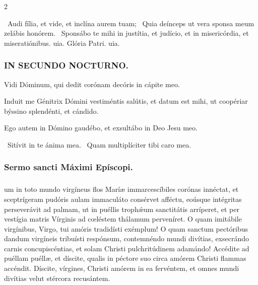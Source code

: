 \documentclass[9pt,twoside]{extarticle}
\begin{document}
\begin{multicols}{2}
{\begin{tightlist}{}
\item {}~Audi fília, et vide, et inclína aurem tuam; \textred{*}~Quia deínceps ut vera sponsa meum zelábis honórem. ~Sponsábo te mihi in justítia, et judício, et in misericórdia, et miseratiónibus. uia. Glória Patri. uia.
\end{tightlist}

\subsubsection*{\center \textsc{IN SECUNDO NOCTURNO.}}
\begin{tightlist}{}
\item {} Vidi Dóminum, qui dedit corónam decóris in cápite meo.
\item {} Induit me Génitrix Dómini vestiméntis salútis, et datum est mihi, ut coopériar býssino splendénti, et cándido.
\item {} Ego autem in Dómino gaudébo, et exsultábo in Deo Jesu meo.
\item {}~Sitívit in te ánima mea. ~Quam multiplíciter tibi caro mea.
\end{tightlist}

\subsubsection*{\center Sermo sancti Máximi Epíscopi.}
\subsubsection*{\center {}}
um in toto mundo virgíneus flos Maríæ immarcescíbiles corónas innéctat, et sceptrígeram pudóris aulam immaculáto consérvet afféctu, eoúsque intégritas perseverávit ad palmam, ut in puéllis trophǽum sanctitátis arríperet, et per vestígia matris Vírginis ad cœléstem thálamum perveníret. O quam imitábile virgínibus, Virgo, tui amóris tradidísti exémplum! O quam sanctum pectóribus dandum virgíneis tribuísti respónsum, contemnéndo mundi divítias, exsecrándo carnis concupiscéntias, et solam Christi pulchritúdinem adamándo! Accédite ad puéllam puéllæ, et díscite, qualis in péctore suo circa amórem Christi flammas accéndit. Díscite, vírgines, Christi amórem in ea fervéntem, et omnes mundi divítias velut stércora recusántem.

}
\end{multicols}
\end{document}
